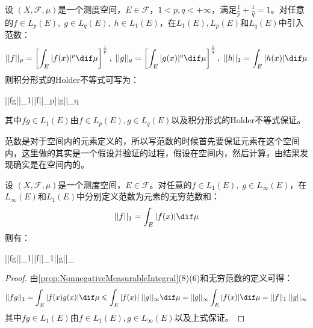 \begin{theorem}
	设	$(X,\mathscr{F},\mu)$是一个测度空间，$E\in\mathscr{F}$，$1<p,q<+\infty$，满足$\frac{1}{p}+\frac{1}{q}=1$。对任意的$f\in L_p(E),\;g\in L_q(E),\;h\in L_1(E)$，在$L_1(E),L_p(E)$和$L_q(E)$中引入范数：
	\begin{equation*}
		||f||_p=\left[\int_{E}^{}|f(x)|^p\dif\mu\right]^\frac{1}{p},\;||g||_q=\left[\int_{E}|g(x)|^q\dif\mu\right]^{\frac{1}{q}},\;||h||_1=\int_{E}|h(x)|\dif\mu
	\end{equation*}
	则积分形式的Holder不等式可写为：
	\begin{inequality*}\label{ineq:holder-ineq-norm}
		||fg||_1\leqslant||f||_p\;||g||_q
	\end{inequality*}
	其中$fg\in L_1(E)$由$f\in L_p(E),g\in L_q(E)$以及积分形式的Holder不等式保证。
\end{theorem}
\begin{note}
	范数是对于空间内的元素定义的，所以写范数的时候首先要保证元素在这个空间内，这里做的其实是一个假设并验证的过程，假设在空间内，然后计算，由结果发现确实是在空间内的。
\end{note}
\begin{theorem}
	设	$(X,\mathscr{F},\mu)$是一个测度空间，$E\in\mathscr{F}$。对任意的$f\in L_1(E),\;g\in L_{\infty}(E)$，在$L_{\infty}(E)$和$L_1(E)$中分别定义范数为元素的无穷范数和：
	\begin{equation*}
		||f||_1=\int_{E}|f(x)|\dif\mu
	\end{equation*}
	则有：
	\begin{inequality*}\label{ineq:holder-ineq-norm+infty}
		||fg||_1\leqslant||f||_1\;||g||_{\infty}
	\end{inequality*}
\end{theorem}
\begin{proof}
	由\cref{prop:NonnegativeMeasurableIntegral}(8)(6)和无穷范数的定义可得：
	\begin{equation*}
		||fg||_1=\int_{E}|f(x)g(x)|\dif\mu\leqslant\int_{E}|f(x)|\;||g||_{\infty}\dif\mu=||g||_{\infty}\int_{E}|f(x)|\dif\mu=||f||_1\;||g||_{\infty}\qedhere
	\end{equation*}
	其中$fg\in L_1(E)$由$f\in L_1(E),g\in L_{\infty}(E)$以及上式保证。
\end{proof}







